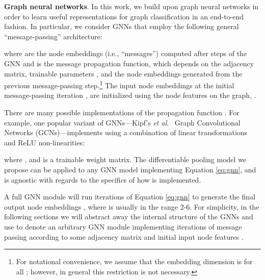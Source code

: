 \documentclass{article}
\newcommand{\xhdr}[1]{{\noindent\bfseries #1}.}
\newcommand{\etal}{\textit{et al}.~}
\begin{document}
\xhdr{Graph neural networks}
In this work, we build upon graph neural networks in order to learn useful representations for graph classification in an end-to-end fashion. 
In particular, we consider GNNs that employ the following general ``message-passing'' architecture:

where  are the node embeddings (i.e., ``messages'') computed after  steps of the GNN and  is the message propagation function, which depends on the adjacency matrix, trainable parameters , and the node embeddings  generated from the previous message-passing step.\footnote{For notational convenience, we assume that the embedding dimension is  for all ; however, in general this restriction is not necessary.}
The input node embeddings  at the initial message-passing iteration , are initialized using
the node features on the graph, . 

There are many possible implementations of the propagation function  \cite{Gil+2017,hamilton2017inductive}.
For example, one popular variant of GNNs---Kipf's \etal \cite{kipf2017semi} Graph Convolutional Networks (GCNs)---implements  using a combination of linear transformations and ReLU non-linearities:

where ,  and  is a trainable weight matrix.
The differentiable pooling model we propose can be applied to any GNN model implementing Equation \eqref{eq:gnn}, and is agnostic with regards to the specifics of how  is implemented. 

A full GNN module will run  iterations of Equation \eqref{eq:gnn} to generate the final output node embeddings , where  is usually in the range 2-6.
For simplicity, in the following sections we will abstract away the internal structure of the GNNs and use  to denote an arbitrary GNN module implementing  iterations of message passing according to some adjacency matrix  and initial input node features . 
\end{document}
